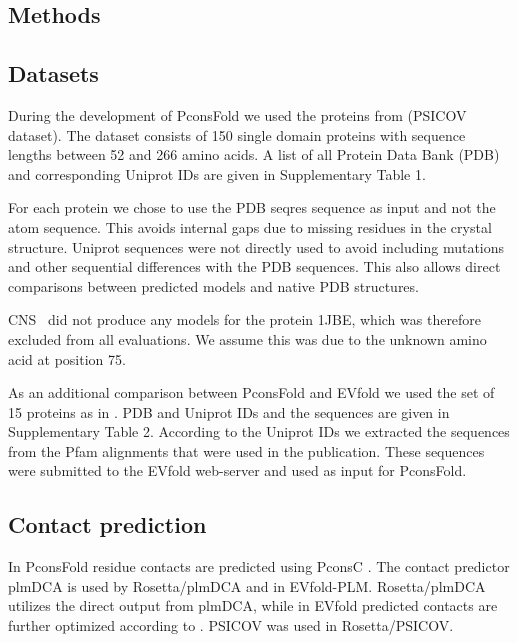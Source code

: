 \documentclass{bioinfo}
\begin{document}
\begin{methods}
\section{Methods}

\subsection{Datasets}
During the development of PconsFold we used the proteins from
\citeauthor{jones_psicov:_2012} \citeyear{jones_psicov:_2012} (PSICOV
dataset). The dataset consists of 150 single domain proteins with sequence
lengths between 52 and 266 amino acids. A list of all Protein Data
Bank (PDB) \cite[]{berman_protein_2000} and corresponding Uniprot
\cite[]{magrane_uniprot_2011} IDs are given in Supplementary Table
1. 


For each protein we chose to use the PDB seqres sequence as input and
not the atom sequence. This avoids internal gaps due to missing
residues in the crystal structure.  Uniprot sequences were not
directly used to avoid including mutations and other sequential
differences with the PDB sequences. This also allows direct
comparisons between predicted models and native PDB structures. 

CNS~\cite[]{Brunger18007608} did not produce any models for the
protein 1JBE, which was therefore excluded from all evaluations.
{\color{red}We assume this was due to the unknown amino acid at
position 75.}

As an additional comparison between PconsFold and EVfold we used the set
of 15 proteins as in \cite{marks_protein_2011}. PDB and Uniprot IDs and the sequences are given in
Supplementary Table 2. According to the Uniprot IDs we extracted the sequences from the
Pfam alignments that were used in the publication. These sequences were
submitted to the EVfold web-server and used as input for PconsFold.

\subsection{Contact prediction}
In PconsFold residue contacts are predicted using
PconsC \cite[]{skwark_PconsC:_2013}. The contact predictor
plmDCA \cite[]{ekeberg_improved_2013} is used by Rosetta/plmDCA and in
EVfold-PLM. Rosetta/plmDCA utilizes the direct output from plmDCA,
while in EVfold predicted contacts are further optimized according to
\cite{marks_protein_2011}. PSICOV \cite[]{jones_psicov:_2012} was used
in Rosetta/PSICOV.



\end{methods}
\end{document}
